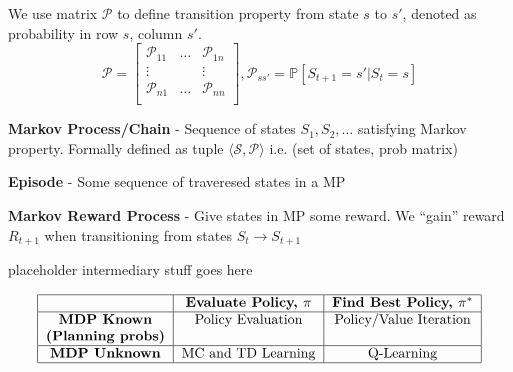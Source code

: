 \documentclass[a4paper,10pt]{article}
\begin{document}
\begin{multicols*}{2}
\begin{tcolorbox}[title={Reinforcement Learning}, module]
    We use matrix $\mathcal{P}$ to define transition property from state $s$ to $s'$, denoted as probability in row $s$, column $s'$.
    \[
        \mathcal{P} =
        \begin{bmatrix}
            \mathcal{P}_{11} & \ldots & \mathcal{P}_{1n} \\
            \vdots && \vdots \\
            \mathcal{P}_{n1} & \ldots & \mathcal{P}_{nn} \\
        \end{bmatrix}
        , \mathcal{P}_{ss'} = \mathbb{P}[S_{t+1} = s' | S_t = s]
    \]

    \textbf{Markov Process/Chain} - Sequence of states $S_1, S_2, \ldots$ satisfying Markov property. Formally defined as tuple $\langle \mathcal{S}, \mathcal{P} \rangle$ i.e. (set of states, prob matrix)

    \textbf{Episode} - Some sequence of traveresed states in a MP

    \textbf{Markov Reward Process} - Give states in MP some reward. We ``gain'' reward $R_{t + 1}$ when transitioning from states $S_t \to S_{t + 1}$

    placeholder intermediary stuff goes here

    \[
        \begin{tabular}{|c|c|c|}
            \hline
            & \textbf{Evaluate Policy, $\pi$} & \textbf{Find Best Policy, $\pi^*$} \\
            \hline
            \textbf{MDP Known} & Policy Evaluation & Policy/Value Iteration \\
            \textbf{(Planning probs)} && \\
            \hline
            \textbf{MDP Unknown} & MC and TD Learning & Q-Learning \\
            \hline
        \end{tabular}
    \]

\end{tcolorbox}

\end{multicols*}
\end{document}
